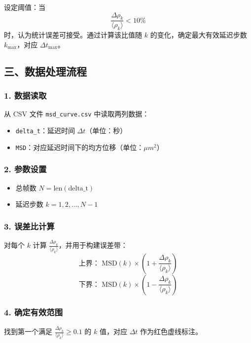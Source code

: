 \documentclass[a4paper]{report} %
\begin{document}
设定阈值：当 
\[
\frac{\Delta \rho_k}{\langle \rho_k \rangle} < 10\%
\] 
时，认为统计误差可接受。通过计算该比值随 $k$ 的变化，确定最大有效延迟步数 $k_{\text{max}}$，对应 $\Delta t_{\text{max}}$。

\subsection*{三、数据处理流程}

\subsubsection*{1. 数据读取}

从 CSV 文件 \texttt{msd\_curve.csv} 中读取两列数据：
\begin{itemize}
    \item \texttt{delta\_t}：延迟时间 $\Delta t$（单位：秒）
    \item \texttt{MSD}：对应延迟时间下的均方位移（单位：$\mu m^2$）
\end{itemize}

\subsubsection*{2. 参数设置}

\begin{itemize}
    \item 总帧数 $N = \text{len}(\text{delta\_t})$
    \item 延迟步数 $k = 1, 2, \dots, N-1$
\end{itemize}

\subsubsection*{3. 误差比计算}

对每个 $k$ 计算 $\frac{\Delta \rho_k}{\langle \rho_k \rangle}$，并用于构建误差带：
\[
\text{上界： } \text{MSD}(k) \times \left(1 + \frac{\Delta \rho_k}{\langle \rho_k \rangle}\right)
\]
\[
\text{下界： } \text{MSD}(k) \times \left(1 - \frac{\Delta \rho_k}{\langle \rho_k \rangle}\right)
\]

\subsubsection*{4. 确定有效范围}

找到第一个满足 $\frac{\Delta \rho_k}{\langle \rho_k \rangle} \geq 0.1$ 的 $k$ 值，对应 $\Delta t$ 作为红色虚线标注。
\end{document}
